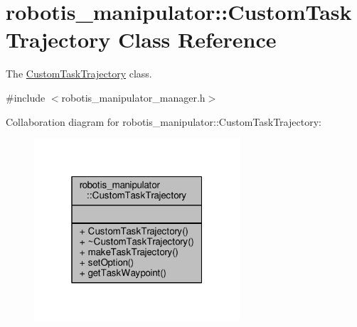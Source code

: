 \hypertarget{classrobotis__manipulator_1_1_custom_task_trajectory}{}\section{robotis\+\_\+manipulator\+:\+:Custom\+Task\+Trajectory Class Reference}
\label{classrobotis__manipulator_1_1_custom_task_trajectory}


The \hyperlink{classrobotis__manipulator_1_1_custom_task_trajectory}{Custom\+Task\+Trajectory} class.  




{\ttfamily \#include $<$robotis\+\_\+manipulator\+\_\+manager.\+h$>$}



Collaboration diagram for robotis\+\_\+manipulator\+:\+:Custom\+Task\+Trajectory\+:\nopagebreak
\begin{figure}[H]
\begin{center}
\leavevmode
\includegraphics[width=217pt]{classrobotis__manipulator_1_1_custom_task_trajectory__coll__graph}
\end{center}
\end{figure}
